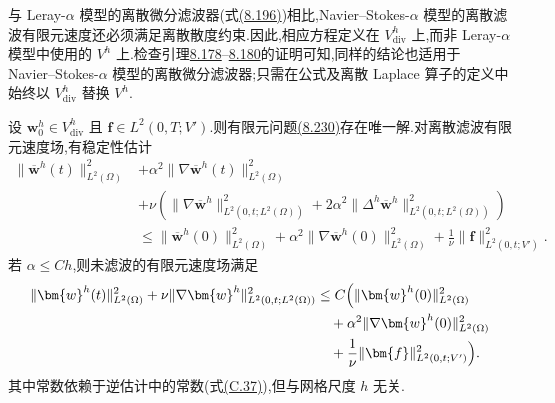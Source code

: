 \begin{note}[离散微分滤波器的性质]
\label{note:navier-stokes-alpha-discrete-filter-properties}
与 Leray-$\alpha$ 模型的离散微分滤波器(式\hyperref[eq:leray-alpha-discrete-differential-filter]{(8.196)})相比,Navier--Stokes-$\alpha$ 模型的离散滤波有限元速度还必须满足离散散度约束.因此,相应方程定义在 $V_{\mathrm{div}}^h$ 上,而非 Leray-$\alpha$ 模型中使用的 $V^h$ 上.检查引理\hyperref[lem:leray-alpha-discrete-filter-properties]{8.178}–\hyperref[lem:leray-alpha-discrete-filter-error]{8.180}的证明可知,同样的结论也适用于 Navier--Stokes-$\alpha$ 模型的离散微分滤波器;只需在公式及离散 Laplace 算子的定义中始终以 $V_{\mathrm{div}}^h$ 替换 $V^h$.
\end{note}

\begin{lemma}
\label{lem:navier-stokes-alpha-fem-existence-stability}
设 $\bm{w}_0^h\in V_{\mathrm{div}}^h$ 且
$\bm{f}\in L^2(0,T;V')$.则有限元问题\hyperref[eq:navier-stokes-alpha-fem-velocity-only]{(8.230)}存在唯一解.对离散滤波有限元速度场,有稳定性估计
\begin{equation}\label{eq:navier-stokes-alpha-fem-stability-filtered}
\begin{aligned}
 \|\overline{\bm{w}}^h(t)\|_{L^2(\Omega)}^2
 &+\alpha^2\|\nabla\overline{\bm{w}}^h(t)\|_{L^2(\Omega)}^2\\
 &+\nu\left(
   \|\nabla\overline{\bm{w}}^h\|_{L^2(0,t;L^2(\Omega))}^2
   +2\alpha^2\|\Delta^h\overline{\bm{w}}^h\|_{L^2(0,t;L^2(\Omega))}^2
   \right)\\
 &\le \|\overline{\bm{w}}^h(0)\|_{L^2(\Omega)}^2
   +\alpha^2\|\nabla\overline{\bm{w}}^h(0)\|_{L^2(\Omega)}^2
   +\frac{1}{\nu}\|\bm{f}\|_{L^2(0,t;V')}^2.
\end{aligned}
\end{equation}
若 $\alpha\le Ch$,则未滤波的有限元速度场满足
\begin{equation}\label{eq:navier-stokes-alpha-fem-stability-unfiltered}
\begin{aligned}
\|\bm{w}^h(t)\|_{L^2(\Omega)}^2
 +\nu\|\nabla\bm{w}^h\|_{L^2(0,t;L^2(\Omega))}^2
 &\le C\Bigl(\|\bm{w}^h(0)\|_{L^2(\Omega)}^2\\
   &\quad+\alpha^2\|\nabla\bm{w}^h(0)\|_{L^2(\Omega)}^2\\
   &\quad+\frac{1}{\nu}\|\bm{f}\|_{L^2(0,t;V')}^2\Bigr).
\end{aligned}
\end{equation}
其中常数依赖于逆估计中的常数(式\hyperref[eq:appendix-c-37]{(C.37)}),但与网格尺度 $h$ 无关.

\end{lemma}
